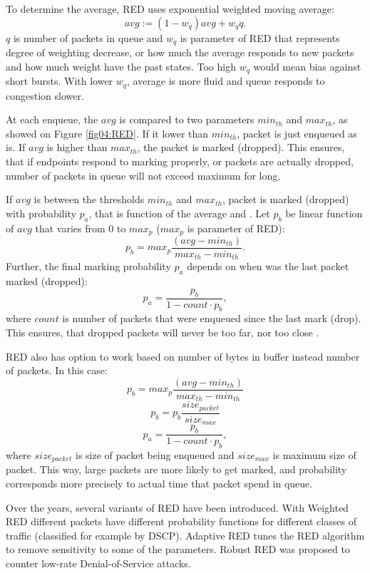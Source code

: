 To determine the average, RED uses exponential weighted moving average:
\[
avg := (1 - w_q)avg+w_qq.
\]
$q$ is number of packets in queue and $w_q$ is parameter of RED that represents degree of weighting decrease, or how much the average responds to new packets and how much weight have the past states. Too high $w_q$ would mean bias against short bursts. With lower $w_q$, average is more fluid and queue responds to congestion slower.

At each enqueue, the $avg$ is compared to two parameters $min_{th}$ and $max_{th}$, as showed on Figure \ref{fig04:RED}. If it lower than $min_{th}$, packet is just enqueued as is. If $avg$ is higher than $max_{th}$, the packet is marked (dropped). This ensures, that if endpoints respond to marking properly, or packets are actually dropped, number of packets in queue will not exceed maximum for long.

If $avg$ is between the thresholds $min_{th}$ and $max_{th}$, packet is marked (dropped) with probability $p_a$, that is function of the average and . Let $p_b$ be linear function of $avg$ that varies from 0 to $max_p$ ($max_p$ is parameter of RED):
\[
  p_b = max_p \frac{(avg - min_{th})}{max_{th} - min_{th}}.
\]
Further, the final marking probability $p_a$ depends on when was the last packet marked (dropped):
\[
p_a = \frac{p_b}{1-count \cdot p_b},
\]
where $count$ is number of packets that were enqueued since the last mark (drop). This ensures, that dropped packets will never be too far, nor too close \cite[Section 7]{Floyd:1993:RED:169931.169935}.

RED also has option to work based on number of bytes in buffer instead number of packets. In this case:
\[
  p_b = max_p \frac{(avg - min_{th})}{max_{th} - min_{th}}
\]\[
  p_b = p_b \frac{size_{packet}}{size_{max}}
\]\[
  p_a = \frac{p_b}{1-count \cdot p_b},
\]
where $size_{packet}$ is size of packet being enqueued and $size_{max}$ is maximum size of packet. This way, large packets are more likely to get marked, and probability corresponds more precisely to actual time that packet spend in queue.

Over the years, several variants of RED have been introduced. With Weighted RED different packets have different probability functions for different classes of traffic (classified for example by DSCP). Adaptive RED \cite{Floyd01adaptivered:} tunes the RED algorithm to remove sensitivity to some of the parameters. Robust RED \cite{RRED} was proposed to counter low-rate Denial-of-Service attacks.

